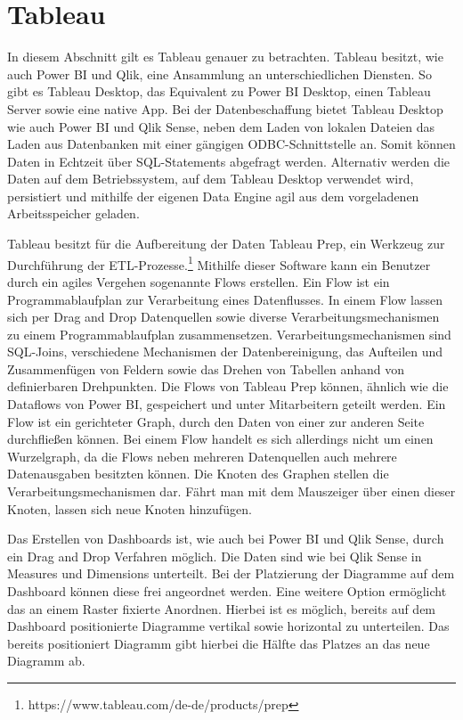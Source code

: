 \section{Tableau}
\label{sec:tableau}
In diesem Abschnitt gilt es Tableau genauer zu betrachten. Tableau besitzt, wie auch Power BI und Qlik,
eine Ansammlung an unterschiedlichen Diensten. So gibt es Tableau Desktop, das Equivalent zu Power BI
Desktop, einen Tableau Server sowie eine native App. Bei der Datenbeschaffung bietet Tableau Desktop wie auch
Power BI und Qlik Sense, neben dem Laden von lokalen Dateien das Laden aus Datenbanken
mit einer gängigen ODBC-Schnittstelle an. Somit können Daten in Echtzeit
über SQL-Statements abgefragt werden. Alternativ werden die Daten auf dem Betriebssystem, auf dem
Tableau Desktop verwendet wird, persistiert und mithilfe der eigenen Data Engine agil aus dem
vorgeladenen Arbeitsspeicher geladen.\cite[S. 50]{ProTableauBook}

Tableau besitzt für die Aufbereitung der Daten Tableau Prep, ein Werkzeug zur Durchführung der
ETL-Prozesse.\footnote{https://www.tableau.com/de-de/products/prep} Mithilfe dieser Software kann ein Benutzer
durch ein agiles Vergehen sogenannte Flows erstellen. Ein Flow ist ein Programmablaufplan
zur Verarbeitung eines Datenflusses. In einem Flow lassen sich per Drag and Drop
Datenquellen sowie diverse Verarbeitungsmechanismen zu einem Programmablaufplan
zusammensetzen. Verarbeitungsmechanismen sind SQL-Joins, verschiedene Mechanismen der Datenbereinigung,
das Aufteilen und Zusammenfügen von Feldern sowie das Drehen von Tabellen anhand
von definierbaren Drehpunkten.\cite{PrepareYourDataForTableauBook} Die Flows von Tableau Prep können,
ähnlich wie die Dataflows von Power BI, gespeichert und unter Mitarbeitern geteilt werden. Ein Flow ist ein gerichteter Graph,
durch den Daten von einer zur anderen Seite durchfließen können. Bei einem Flow handelt es sich allerdings nicht um einen Wurzelgraph,
da die Flows neben mehreren Datenquellen auch mehrere Datenausgaben besitzten können. Die Knoten des Graphen
stellen die Verarbeitungsmechanismen dar. Fährt man mit dem Mauszeiger über einen dieser
Knoten, lassen sich neue Knoten hinzufügen.

Das Erstellen von Dashboards ist, wie auch bei Power BI und Qlik Sense, durch ein Drag and Drop Verfahren möglich.
Die Daten sind wie bei Qlik Sense in Measures und Dimensions unterteilt. Bei der Platzierung der Diagramme auf dem
Dashboard können diese frei angeordnet werden. Eine weitere Option ermöglicht das an einem Raster fixierte Anordnen.
Hierbei ist es möglich, bereits auf dem Dashboard positionierte Diagramme vertikal sowie horizontal zu unterteilen.
Das bereits positioniert Diagramm gibt hierbei die Hälfte das Platzes an das neue Diagramm ab.
